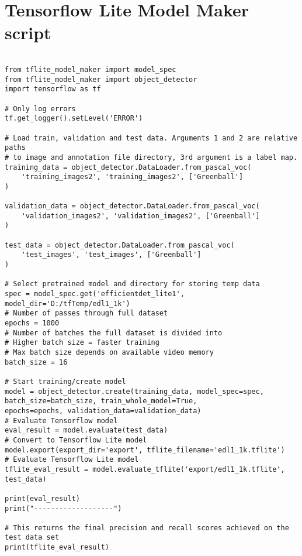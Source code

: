 \section{Tensorflow Lite Model Maker script}

\begin{lstlisting}[language=PythonPlus, basicstyle=\tiny,]

from tflite_model_maker import model_spec
from tflite_model_maker import object_detector
import tensorflow as tf

# Only log errors
tf.get_logger().setLevel('ERROR')

# Load train, validation and test data. Arguments 1 and 2 are relative paths
# to image and annotation file directory, 3rd argument is a label map.
training_data = object_detector.DataLoader.from_pascal_voc(
    'training_images2', 'training_images2', ['Greenball']
)

validation_data = object_detector.DataLoader.from_pascal_voc(
    'validation_images2', 'validation_images2', ['Greenball']
)

test_data = object_detector.DataLoader.from_pascal_voc(
    'test_images', 'test_images', ['Greenball']
)

# Select pretrained model and directory for storing temp data
spec = model_spec.get('efficientdet_lite1', model_dir='D:/tfTemp/edl1_1k')
# Number of passes through full dataset
epochs = 1000
# Number of batches the full dataset is divided into
# Higher batch size = faster training
# Max batch size depends on available video memory
batch_size = 16

# Start training/create model
model = object_detector.create(training_data, model_spec=spec,
batch_size=batch_size, train_whole_model=True,
epochs=epochs, validation_data=validation_data)
# Evaluate Tensorflow model
eval_result = model.evaluate(test_data)
# Convert to Tensorflow Lite model
model.export(export_dir='export', tflite_filename='edl1_1k.tflite')
# Evaluate Tensorflow Lite model
tflite_eval_result = model.evaluate_tflite('export/edl1_1k.tflite', test_data)

print(eval_result)
print("-------------------")

# This returns the final precision and recall scores achieved on the test data set
print(tflite_eval_result)

\end{lstlisting}